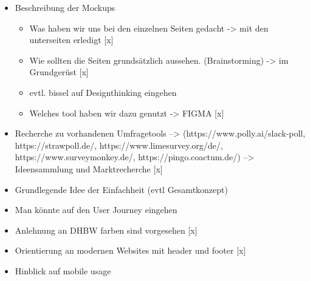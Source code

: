 











\begin{itemize}
	\item Beschreibung der Mockups 
	 \begin{itemize}
		 \item Was haben wir uns bei den einzelnen Seiten gedacht -> mit den unterseiten erledigt [x]
		 \item Wie sollten die Seiten grundsätzlich aussehen. (Brainstorming) -> im Grundgerüst [x]
		 \item evtl. bissel auf Designthinking eingehen 
		 \item Welches tool haben wir dazu genutzt ->  FIGMA [x]
	 \end{itemize}
	 \item Recherche zu vorhandenen Umfragetools --> (https://www.polly.ai/slack-poll, https://strawpoll.de/, https://www.limesurvey.org/de/, https://www.surveymonkey.de/, https://pingo.coactum.de/)
	 --> Ideensammlung und Marktrecherche [x]
	 \item Grundlegende Idee der Einfachheit (evtl Gesamtkonzept) 
	 \item Man könnte auf den User Journey eingehen 
	 \item Anlehnung an DHBW farben sind vorgesehen [x]
	 \item Orientierung an modernen Websites mit header und footer [x]
	 \item Hinblick auf mobile usage
\end{itemize}
